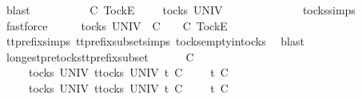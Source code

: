 \begin{isabellebody}
\ blast\isanewline
{}\isamarkupfalse%
\isanewline
\ \ \isamarkupfalse%
\ {\isasymrho}\ {\isasymsigma}\isanewline
\ \ \isamarkupfalse%
\ {\isachardoublequoteopen}{\isasymrho}\ {\isasymlesssim}\isactrlsub C\ {\isacharbrackleft}Tock{\isacharbrackright}\isactrlsub E\ {\isacharhash}\ {\isasymsigma}{\isachardoublequoteclose}\ {\isachardoublequoteopen}{\isasymrho}\ {\isasymin}\ tocks\ UNIV{\isachardoublequoteclose}\isanewline
\ \ \isamarkupfalse%
\ \isamarkupfalse%
\ {\isachardoublequoteopen}{\isasymrho}\ {\isacharequal}\ {\isacharbrackleft}{\isacharbrackright}{\isachardoublequoteclose}\isanewline
\ \ \ \ \isamarkupfalse%
\ tocks{\isachardot}simps\ \isamarkupfalse%
\ fastforce\isanewline
\ \ \isamarkupfalse%
\ \isamarkupfalse%
\ {\isachardoublequoteopen}{\isasymexists}{\isasymrho}{\isacharprime}{\isasymin}tocks\ UNIV{\isachardot}\ {\isasymrho}\ {\isasymlesssim}\isactrlsub C\ {\isasymrho}{\isacharprime}\ {\isasymand}\ {\isasymrho}{\isacharprime}\ {\isasymle}\isactrlsub C\ {\isacharbrackleft}Tock{\isacharbrackright}\isactrlsub E\ {\isacharhash}\ {\isasymsigma}{\isachardoublequoteclose}\isanewline
\ \ \ \ \isamarkupfalse%
\ tt{\isacharunderscore}prefix{\isachardot}simps{\isacharparenleft}{}{\isacharparenright}\ tt{\isacharunderscore}prefix{\isacharunderscore}subset{\isachardot}simps{\isacharparenleft}{}{\isacharparenright}\ tocks{\isachardot}empty{\isacharunderscore}in{\isacharunderscore}tocks\ \isamarkupfalse%
\ blast\isanewline
{}\isamarkupfalse%
%
\endisatagproof
{\isafoldproof}%
%
\isadelimproof
\isanewline
%
\endisadelimproof
\isanewline
{}\isamarkupfalse%
\ longest{\isacharunderscore}pretocks{\isacharunderscore}tt{\isacharunderscore}prefix{\isacharunderscore}subset{\isacharcolon}\isanewline
\ \ \ {\isachardoublequoteopen}{\isasymrho}{\isacharprime}\ {\isacharat}\ {\isasymsigma}{\isacharprime}\ {\isasymlesssim}\isactrlsub C\ {\isasymrho}\ {\isacharat}\ {\isasymsigma}{\isachardoublequoteclose}\isanewline
\ \ \ {\isachardoublequoteopen}{\isasymrho}\ {\isasymin}\ tocks\ UNIV{\isachardoublequoteclose}\ {\isachardoublequoteopen}{\isasymforall}t{\isasymin}tocks\ UNIV{\isachardot}\ t\ {\isasymle}\isactrlsub C\ {\isasymrho}\ {\isacharat}\ {\isasymsigma}\ {\isasymlongrightarrow}\ t\ {\isasymle}\isactrlsub C\ {\isasymrho}{\isachardoublequoteclose}\isanewline
\ \ \ {\isachardoublequoteopen}{\isasymrho}{\isacharprime}\ {\isasymin}\ tocks\ UNIV{\isachardoublequoteclose}\ {\isachardoublequoteopen}{\isasymforall}t{\isasymin}tocks\ UNIV{\isachardot}\ t\ {\isasymle}\isactrlsub C\ {\isasymrho}{\isacharprime}\ {\isacharat}\ {\isasymsigma}{\isacharprime}\ {\isasymlongrightarrow}\ t\ {\isasymle}\isactrlsub C\ {\isasymrho}{\isacharprime}{\isachardoublequoteclose}\isanewline

\end{isabellebody}
